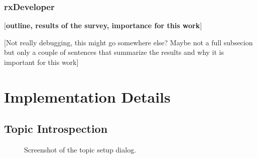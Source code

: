 \subsubsection{rxDeveloper}
[\textbf{outline, results of the survey, importance for this work}]
\cite{Muellers2012}

[Not really debugging, this might go somewhere else? Maybe not a full subsecion but only a couple of sentences that summarize the results and why it is important for this work]

\section{Implementation Details}

\subsection{Topic Introspection}

\begin{figure}[thpb]
  \centering
  \caption{Screenshot of the topic setup dialog.}
  \label{topic setup screenshot}
\end{figure}

